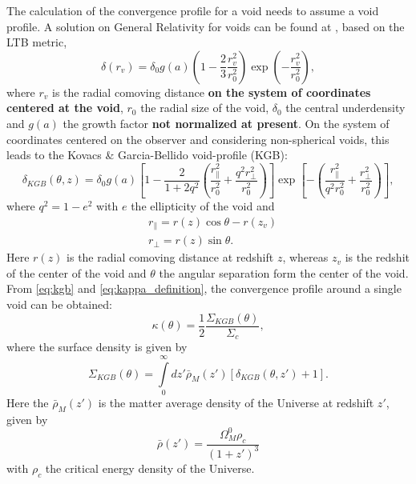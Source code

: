The calculation of the convergence profile for a void needs to assume a void profile. A solution on General Relativity for voids can be found at \cite{2008JCAP...04..003G,2016MNRAS.455.1246F,2016MNRAS.462.1882K}, based on the LTB metric,
\begin{equation}
\delta(r_v) = \delta_0g(a)\left(1-\frac{2}{3}\frac{r_v^2}{r_0^2}\right)\exp\left(-\frac{r_v^2}{r_0^2}\right),
\end{equation}
where $r_v$ is the radial comoving distance {\bf on the system of coordinates centered at the void}, $r_0$ the radial size of the void, $\delta_0$ the central underdensity and $g(a)$ the growth factor {\bf not normalized at present}. On the system of coordinates centered on the observer and considering non-spherical voids, this leads to the Kovacs \& Garcia-Bellido void-profile (KGB):
\begin{equation}
\delta_{KGB}(\theta,z) = \delta_0g(a)\left[1-\frac{2}{1+2q^2}\left(\frac{r_\parallel^2}{r_0^2}+\frac{q^2r_\perp^2}{r_0^2}\right)\right]\exp\left[-\left(\frac{r_\parallel^2}{q^2r_0^2}+\frac{r_\perp^2}{r_0^2}\right)\right],
\label{eq:kgb}
\end{equation}
where $q^2=1-e^2$ with $e$ the ellipticity of the void and
\begin{eqnarray}
&r_\parallel=r(z)\cos\theta -r(z_v)\\
&r_\perp=r(z)\sin\theta.
\end{eqnarray}
Here $r(z)$ is the radial comoving distance at redshift $z$, whereas $z_v$ is the redshit of the center of the void and $\theta$ the angular separation form the center of the void. From \autoref{eq:kgb} and \autoref{eq:kappa_definition}, the convergence profile around a single void can be obtained:
\begin{equation}
\kappa(\theta) = \frac{1}{2}\frac{\Sigma_{KGB}(\theta)}{\Sigma_c},
\end{equation}
where the surface density is given by
\begin{equation}
\Sigma_{KGB}(\theta) = \int\limits_0^\infty dz'\bar\rho_M(z')[\delta_{KGB}(\theta,z')+1].
\end{equation}
Here the $\bar\rho_M(z')$ is the matter average density of the Universe at redshift $z'$, given by
\begin{equation}
\bar\rho(z') = \frac{\Omega_M^0\rho_c}{(1+z')^3}
\end{equation}
with $\rho_c$ the critical energy density of the Universe.